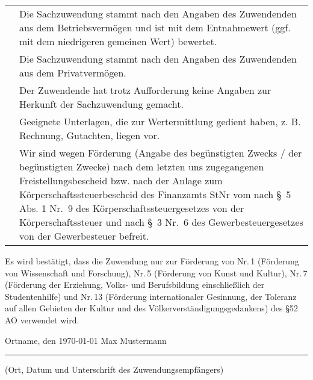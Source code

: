 \documentclass[12pt,ngerman]{scrartcl}
\newcommand{\marked}{\scalebox{1.5}{\XBox}} %
\newcommand{\notmarked}{\scalebox{1.5}{\Square}}
\begin{document}
{\footnotesize
\begin{tabular}{cp{}}
\hspace{1em} \marked & Die Sachzuwendung stammt nach den Angaben des Zuwendenden aus dem Betriebsvermögen und ist mit dem Entnahmewert (ggf. mit dem niedrigeren gemeinen Wert) bewertet. \\
\hspace{1em} \notmarked & Die Sachzuwendung stammt nach den Angaben des Zuwendenden aus dem Privatvermögen.  \\
\hspace{1em} \notmarked & Der Zuwendende hat trotz Aufforderung keine Angaben zur Herkunft der Sachzuwendung gemacht. \\
\hspace{1em} \notmarked & Geeignete Unterlagen, die zur Wertermittlung gedient haben, z. B. Rechnung, Gutachten, liegen vor. \\
\hspace{1em} \notmarked & Wir sind wegen Förderung (Angabe des begünstigten Zwecks / der begünstigten Zwecke) nach dem letzten uns zugegangenen Freistellungsbescheid bzw. nach der Anlage zum Körperschaftssteuerbescheid des Finanzamts \hspace{5em} StNr \hspace{5em} vom \hspace{5em} nach §~5 Abs. 1 Nr.~9 des Körperschaftssteuergesetzes von der Körperschaftssteuer und nach §~3 Nr.~6 des Gewerbesteuergesetzes von der Gewerbesteuer befreit.
\end{tabular}}

\begin{mdframed}[style=MyFormStyle]%
Es wird bestätigt, dass die Zuwendung nur zur Förderung von Nr.\,1 (Förderung von Wissenschaft und Forschung), Nr.\,5 (Förderung von Kunst und Kultur), Nr.\,7 (Förderung der Erziehung, Volks- und Berufsbildung einschließlich der Studentenhilfe) und Nr.\,13 (Förderung internationaler Gesinnung, der Toleranz auf allen Gebieten der Kultur und des Völkerverständigungsgedankens) des §52 AO verwendet wird.
\end{mdframed}

\vspace*{2.25em}
{\footnotesize Ortname, den \today \hspace*{20em} Max Mustermann}

\hrule

\vspace*{0.5em} (Ort, Datum und Unterschrift des Zuwendungsempfängers) 
\end{document}
